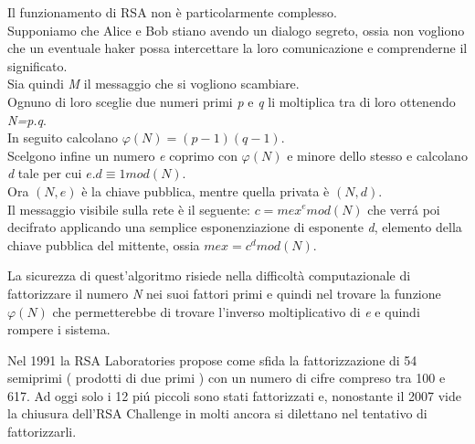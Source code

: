 Il funzionamento di RSA non è particolarmente complesso. \\
Supponiamo che Alice e Bob stiano avendo un dialogo segreto, ossia non vogliono che un eventuale haker possa intercettare la loro comunicazione e comprenderne il significato. \\
Sia quindi \emph{M} il messaggio che si vogliono scambiare.  \\
Ognuno di loro sceglie due numeri primi \emph{p} e \emph{q} li moltiplica tra di loro ottenendo \emph{N=p.q}. \\
In seguito calcolano $\varphi( N)  = ( p-1)(q-1)$. \\
Scelgono infine un numero \emph{e} coprimo con $\varphi(N)$ e minore dello stesso e calcolano \emph{d} tale per cui $e.d\equiv 1 mod(N)$. \\
Ora $(N, e)$ è la chiave pubblica, mentre quella privata è $(N, d)$. \\
Il messaggio visibile sulla rete è il seguente: $c=mex^e mod(N)$ che verr\'{a} poi decifrato applicando una semplice esponenziazione di esponente \emph{d}, elemento della chiave pubblica del mittente, ossia $mex=c^d mod(N)$.

La sicurezza di quest'algoritmo risiede nella difficoltà computazionale di fattorizzare il numero \emph{N} nei suoi fattori primi e quindi nel trovare la funzione $\varphi(N)$
che permetterebbe di trovare l'inverso moltiplicativo di \emph{e} e quindi rompere i sistema.

Nel 1991 la RSA Laboratories propose come sfida la fattorizzazione di 54 semiprimi ( prodotti di due primi ) con un numero di cifre compreso tra 100 e 617.
Ad oggi solo i 12 pi\'{u} piccoli sono stati fattorizzati e, nonostante il 2007 vide la chiusura dell'RSA Challenge in molti ancora si dilettano nel tentativo di fattorizzarli.